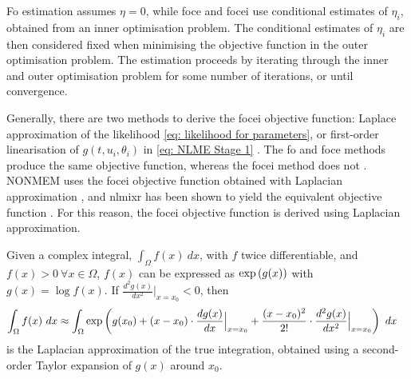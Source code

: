 Fo estimation assumes $\eta=0$, while foce and focei use conditional estimates of $\eta_i$, obtained from an inner optimisation problem. The conditional estimates of $\eta_i$ are then considered fixed when minimising the objective function in the outer optimisation problem. The estimation proceeds by iterating through the inner and outer optimisation problem for some number of iterations, or until convergence.

Generally, there are two methods to derive the focei objective function: Laplace approximation of the likelihood \eqref{eq: likelihood for parameters}, or first-order linearisation of $g(t, u_i, \theta_i)$ in \eqref{eq: NLME Stage 1} \citep[p. 161]{Bae2016}. The fo and foce methods produce the same objective function, whereas the focei method does not \citep[p. 581]{Wang2007}. NONMEM uses the focei objective function obtained with Laplacian approximation \citep[p. 585]{Wang2007}, and nlmixr has been shown to yield the equivalent objective function \citep{nlmixr}. For this reason, the focei objective function is derived using Laplacian approximation.

Given a complex integral, $ \int_\Omega f(x) \ dx$, with $f$ twice differentiable, and $f(x)>0 \ \forall x \in \Omega$, $f(x)$ can be expressed as $\text{exp}\left({g(x)}\right)$ with $g(x)=\log f(x)$. If $\frac{d^2 g(x)}{d x^2}\big\rvert_{x=x_0}<0$, then
\begin{align}
    \int_\Omega f(x) \ dx &\approx \int_\Omega \text{exp}\left({g(x_0) +(x-x_0) \cdot\frac{d g(x)}{d x}\Big\rvert_{x=x_0} +\frac{(x-x_0)^2}{2!} \cdot \frac{d^2 g(x)}{d x^2}\Big\rvert_{x=x_0}}\right)\ dx \label{eq: LAPL approx}
\end{align}
is the Laplacian approximation of the true integration, obtained using a second-order Taylor expansion of $g(x)$ around $x_0$. 

